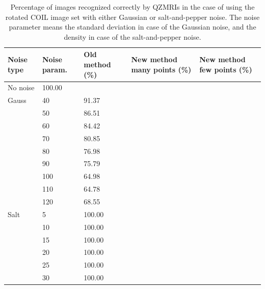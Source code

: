 \begin{table}
    \centering
    \begin{tabular}{|p{2.15cm}|p{1.8cm}|p{3cm}|p{2.74cm}|p{2.6cm}|} \hline
        \textbf{Noise type} & \textbf{Noise param.} & \textbf{Old method} (\%) & \textbf{New method} many points (\%)& \textbf{New method} few points (\%) \\ \hline\hline
        No noise & 100.00 &  &  & \\ \cline{1-5}
        Gauss & 40 & 91.37 &  &  \\ \cline{2-5}
        & 50 & 86.51 &  &  \\ \cline{2-5}
        & 60 & 84.42 &  &  \\ \cline{2-5}
        & 70 & 80.85 &  &  \\ \cline{2-5}
        & 80 & 76.98 &  &  \\ \cline{2-5}
        & 90 & 75.79 &  &  \\ \cline{2-5}
        & 100 & 64.98 &  &  \\ \cline{2-5}
        & 110 & 64.78 &  &  \\ \cline{2-5}
        & 120 & 68.55 &  &  \\ \cline{1-5}
        Salt & 5 & 100.00 &  & \\ \cline{2-5}
        & 10 & 100.00 &  &  \\ \cline{2-5}
        & 15 & 100.00 &  &  \\ \cline{2-5}
        & 20 & 100.00 &  &  \\ \cline{2-5}
        & 25 & 100.00 &  &  \\ \cline{2-5}
        & 30 & 100.00 &  &  \\ \cline{1-5}
    \end{tabular}
    \caption{Percentage of images recognized correctly by QZMRIs in the case of using the rotated COIL image set with either Gaussian or salt-and-pepper noise. The noise parameter means the standard deviation in case of the Gaussian noise, and the density in case of the salt-and-pepper noise.}
    \label{tab:recognition_rot}
\end{table}

